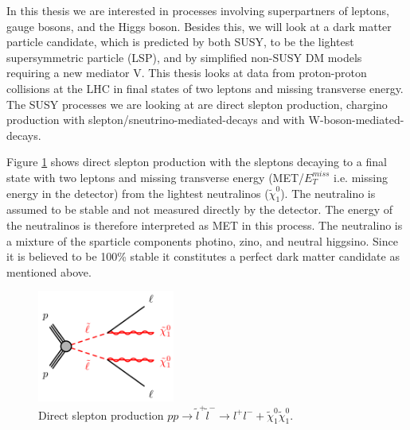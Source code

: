 

In this thesis we are interested in processes involving superpartners of leptons, gauge bosons, and the Higgs boson. Besides this, we will look at a dark matter particle candidate, which is predicted by both  SUSY, to be the lightest supersymmetric particle (LSP), and by simplified non-SUSY DM models requiring a new mediator V. This thesis looks at data from proton-proton collisions at the LHC in final states of two leptons and missing transverse energy. The SUSY processes we are looking at are direct slepton production, chargino production with slepton/sneutrino-mediated-decays and with W-boson-mediated-decays. 

Figure \ref{fig:SlepSlepFeynman} shows direct slepton production with the sleptons decaying to a final state with two leptons and missing transverse energy (MET/$E_T^{miss}$ i.e. missing energy in the detector) from the lightest neutralinos ($\tilde{\chi}_1^0$). The neutralino is assumed to be stable and not measured directly by the detector. The energy of the neutralinos is therefore interpreted as MET in this process. The neutralino is a mixture of the sparticle components photino, zino, and neutral higgsino. Since it is believed to be 100\% stable  it constitutes a perfect dark matter candidate as mentioned above.  
\begin{figure}[H]
    \centering
    \includegraphics[width = 0.4\textwidth]{Figures/FeynmanDiagrams/SlepSlepFeynman.png}
    \caption{Direct slepton production $pp \rightarrow \tilde{l}^+ \tilde{l}^- \rightarrow l^+l^- + \tilde{\chi}_1^0 \tilde{\chi}_1^0$.}
    \label{fig:SlepSlepFeynman}
\end{figure}

